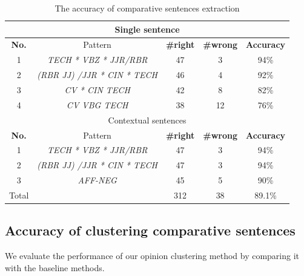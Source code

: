 \begin{table}
	\centering
	\caption{The accuracy of comparative sentences extraction}
	\vspace{-2mm}
	\begin{tabular}{c c c c c}
	\hline
	\multicolumn{5}{c}{Single sentence}\\
	\hline
	\textbf{No.} & Pattern & \textbf{\#right} & \textbf{\#wrong} & \textbf{Accuracy} \\ \hline
	1 & \textit{TECH * VBZ * JJR/RBR} & 47 & 3  & 94\% \\
	2 & \textit{(RBR JJ) /JJR * CIN * TECH} & 46 & 4  & 92\% \\
	3 & \textit{CV * CIN TECH} & 42 & 8 & 82\% \\
	4 & \textit{CV VBG TECH} & 38 & 12 & 76\% \\
	\hline
	\multicolumn{5}{c}{Contextual sentences}\\
	\hline
	\textbf{No.} & Pattern & \textbf{\#right} & \textbf{\#wrong} & \textbf{Accuracy} \\ \hline
	1 & \textit{TECH * VBZ * JJR/RBR} & 47 & 3  & 94\% \\
	2 & \textit{(RBR JJ) /JJR * CIN * TECH} & 47 & 3  & 94\% \\
	3 & \textit{AFF-NEG} & 45 & 5  & 90\% \\
	\hline
	Total &  & 312 & 38 & 89.1\% \\
	\hline
	\end{tabular}
	\vspace{-2mm}
	\label{tab:patternAccuracy}
\end{table}

\subsection{Accuracy of clustering comparative sentences}
\label{sec:clusterEvaluate}
We evaluate the performance of our opinion clustering method by comparing it with the baseline methods.

